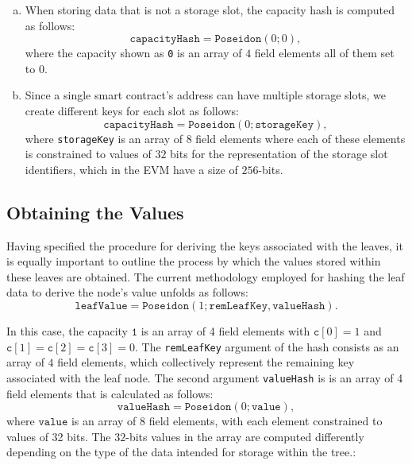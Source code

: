 \begin{enumerate}[(a)]

\item When storing data that is not a storage slot, the capacity hash is computed as follows:
\[
\texttt{capacityHash}  = \texttt{Poseidon}(0; 0),
\]
where the capacity shown as \texttt{0} is an array of $4$ field elements all of them set to $0$.

\item Since a single smart contract's address can have multiple storage slots, we create different keys for each slot as follows:
\[
\texttt{capacityHash} = \texttt{Poseidon}(0; \texttt{storageKey}),
\]
where \texttt{storageKey} is an array of $8$ field elements where each of these elements is constrained to values of $32$ bits for the representation of the storage slot identifiers, which in the EVM have a size of $256$-bits.

\end{enumerate}


\subsection{Obtaining the Values}

Having specified the procedure for deriving the keys associated with the leaves, it is equally important to outline the process by which the values stored within these leaves are obtained. The current methodology employed for hashing the leaf data to derive the node's value unfolds as follows:
\[
\texttt{leafValue} = \texttt{Poseidon}(1; \texttt{remLeafKey}, \texttt{valueHash}).
\]

In this case, the capacity $\texttt{1}$ is an array of 4 field elements with $\texttt{c}[0] = 1$ and $\texttt{c}[1] = \texttt{c}[2] = \texttt{c}[3] = 0$. The \texttt{remLeafKey} argument of the hash consists as an array of $4$ field elements, which collectively represent the remaining key associated with the leaf node. The second argument \texttt{valueHash} is is an array of 4 field elements that is calculated as follows:
\[
\texttt{valueHash} = \texttt{Poseidon}(0; \texttt{value}),
\]
where $\texttt{value}$ is an array of 8 field elements, with each element constrained to values of 32 bits. The $32$-bits values in the array are computed differently depending on the type of the data intended for storage within the tree.:


